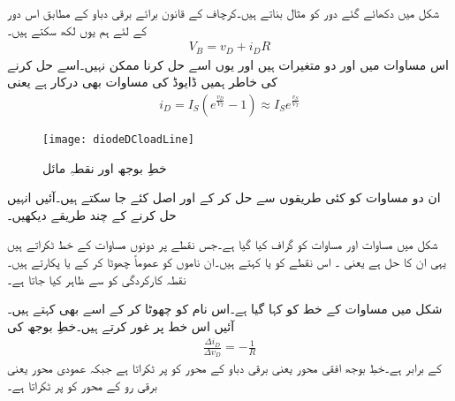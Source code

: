 شکل   میں دکھائے گئے دور کو مثال بناتے ہیں۔کرچاف کے قانون برائے برقی دباو کے مطابق اس دور کے لئے ہم یوں لکھ سکتے ہیں۔
\begin{align} \label{مساوات_ڈایوڈ_بار_کا_خط}
V_B=v_D+i_D R
\end{align}
اس مساوات میں  اور  دو متغیرات ہیں اور یوں اسے حل کرنا ممکن نہیں۔اسے حل کرنے کی خاطر ہمیں ڈایوڈ کی مساوات بھی درکار ہے یعنی
\begin{align} \label{مساوات_ڈایوڈ_کا_خط_جس_پر_بار_لدا_جائے}
i_D=I_S \left (e^{\frac{v_D}{V_T}}-1 \right ) \approx I_S e^{\frac{v_S}{V_T}}
\end{align}
%
\begin{figure}
\centering
\texttt{[image: diodeDCloadLine]}
\caption{ خطِ بوجھ اور نقطہِ مائل}
\label{شکل_ڈایوڈ_بار_کا_خط}
\end{figure}
	ان دو مساوات کو کئی طریقوں سے حل کر کے  اور  اصل کئے جا سکتے ہیں۔آئیں انہیں حل کرنے کے چند طریقے دیکھیں۔

شکل  میں مساوات   اور مساوات   کو گراف کیا گیا ہے۔جس نقطے پر دونوں مساوات کے خط ٹکراتے ہیں یہی ان کا حل ہے یعنی ۔ اس نقطے کو  یا   کہتے ہیں۔ان ناموں کو عموماً چھوٹا کر کے  یا  پکارتے ہیں۔نقطہ کارکردگی کو  سے ظاہر کیا جاتا ہے۔

شکل  میں مساوات   کے خط کو  کہا گیا ہے۔اس نام کو چھوٹا کر کے اسے   بھی کہتے ہیں۔آئیں اس خط پر غور کرتے ہیں۔خطِ بوجھ کی 
\begin{align*}
\frac{\Delta i_D}{\Delta v_D}=-\frac{1}{R}
\end{align*}
کے برابر ہے۔خطِ بوجھ افقی محور یعنی برقی دباو  کے محور کو  پر ٹکراتا ہے جبکہ عمودی محور یعنی برقی رو  کے محور کو   پر ٹکراتا ہے۔

